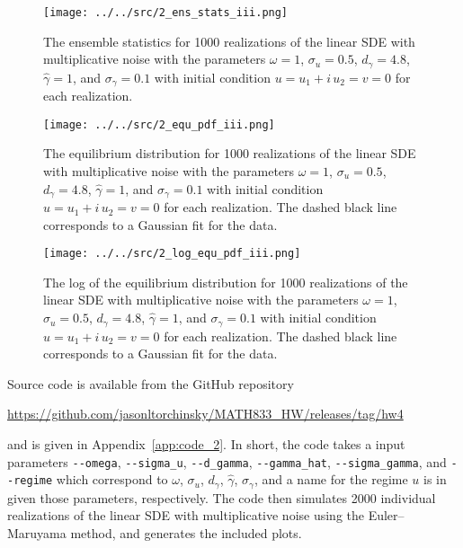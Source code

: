 \begin{enumerate}[(i)]
	\begin{figure}[H]
		\centering
		\texttt{[image: ../../src/2\_ens\_stats\_iii.png]}
		\caption{The ensemble statistics for 1000 realizations of the linear SDE with multiplicative noise with the parameters $\omega = 1$, $\sigma_u = 0.5$, $d_{\gamma} = 4.8$, $\widehat{\gamma} = 1$, and $\sigma_{\gamma} = 0.1$ with initial condition $u = u_1 + i\,u_2 = v = 0$ for each realization.}
		\label{fig:2_ens_stats_iii}
	\end{figure}
	
	\begin{figure}[H]
		\centering
		\texttt{[image: ../../src/2\_equ\_pdf\_iii.png]}
		\caption{The equilibrium distribution for 1000 realizations of the linear SDE with multiplicative noise with the parameters $\omega = 1$, $\sigma_u = 0.5$, $d_{\gamma} = 4.8$, $\widehat{\gamma} = 1$, and $\sigma_{\gamma} = 0.1$ with initial condition $u = u_1 + i\,u_2 = v = 0$ for each realization. The dashed black line corresponds to a Gaussian fit for the data.}
		\label{fig:2_equ_pdf_iii}
	\end{figure}
	
	\begin{figure}[H]
		\centering
		\texttt{[image: ../../src/2\_log\_equ\_pdf\_iii.png]}
		\caption{The log of the equilibrium distribution for 1000 realizations of the linear SDE with multiplicative noise with the parameters $\omega = 1$, $\sigma_u = 0.5$, $d_{\gamma} = 4.8$, $\widehat{\gamma} = 1$, and $\sigma_{\gamma} = 0.1$ with initial condition $u = u_1 + i\,u_2 = v = 0$ for each realization. The dashed black line corresponds to a Gaussian fit for the data.}
		\label{fig:2_log_equ_pdf_iii}
	\end{figure}

\end{enumerate}

Source code is available from the GitHub repository
	
	\begin{center}
		\url{https://github.com/jasonltorchinsky/MATH833_HW/releases/tag/hw4}
	\end{center}

	and is given in Appendix~\ref{app:code_2}. In short, the code takes a input parameters \texttt{-{-}omega}, \texttt{-{-}sigma\_u}, \texttt{-{-}d\_gamma}, \texttt{-{-}gamma\_hat}, \texttt{-{-}sigma\_gamma}, and \texttt{-{-}regime} which correspond to $\omega$, $\sigma_{u}$, $d_{\gamma}$, $\widehat{\gamma}$, $\sigma_{\gamma}$, and a name for the regime $u$ is in given those parameters, respectively. The code then simulates 2000 individual realizations of the linear SDE with multiplicative noise using the Euler--Maruyama method, and generates the included plots.
